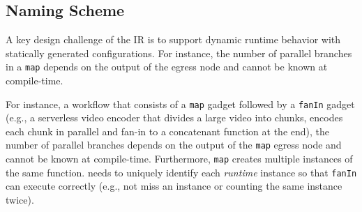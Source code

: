 










\subsection{Naming Scheme}\label{sec:ir:naming}

A key design challenge of the \name{} IR is to support dynamic runtime
behavior with statically generated configurations. For instance, the number of
parallel branches in a \texttt{map} depends on the output of the egress node
and cannot be known at compile-time. 

For instance, a workflow that consists of a \texttt{map} gadget followed by a
\texttt{fanIn} gadget (e.g., a serverless video encoder that divides a large
video into chunks, encodes each chunk in parallel and fan-in to a concatenant
function at the end), the number of parallel branches depends on the output of
the \texttt{map} egress node and cannot be known at compile-time. Furthermore,
\texttt{map} creates multiple instances of the same function. \name{} needs to
uniquely identify each \emph{runtime} instance so that \texttt{fanIn} can
execute correctly (e.g., not miss an instance or counting the same instance
twice).

